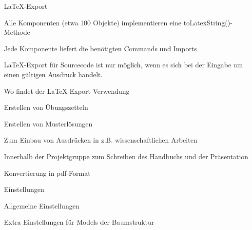 {
  \begin{itemgroup}{\LaTeX-Export}
    \item Alle Komponenten (etwa 100 Objekte) implementieren eine toLatexString()-Methode
    \item Jede Komponente liefert die benötigten Commands und Imports
    \item \LaTeX-Export für Sourcecode ist nur möglich, wenn es sich bei
      der Eingabe um einen gültigen Ausdruck handelt.

  \end{itemgroup}
}

{
  \begin{itemgroup}{Wo findet der \LaTeX-Export Verwendung}
    \item Erstellen von Übungszetteln
    \item Erstellen von Musterlösungen
    \item Zum Einbau von Ausdrücken in z.B. wissenschaftlichen Arbeiten
    \item Innerhalb der Projektgruppe zum Schreiben des Handbuchs und der Präsentation
    \item Konvertierung in pdf-Format
  \end{itemgroup}
}

{
  \begin{itemgroup}{Einstellungen}
    \item Allgemeine Einstellungen
    \item Extra Einstellungen für Models der Baumstruktur

  \end{itemgroup}
}